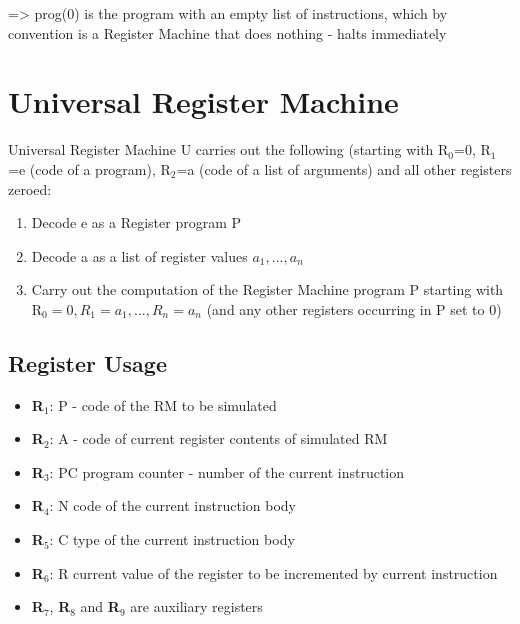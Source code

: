 \documentclass{article}
\begin{document}
=> prog(0) is the program with an empty list of instructions, which by convention is a Register Machine that does nothing - halts immediately

\section{Universal Register Machine}
Universal Register Machine U carries out the following (starting with R$_{0}$=0, R$_{1}$=e (code of a program), R$_{2}$=a (code of a list of arguments) and all other registers zeroed:
\begin{enumerate}
    \item Decode e as a Register program P
    \item Decode a as a list of register values $a_{1}, ..., a_{n}$
    \item Carry out the computation of the Register Machine program P starting with R$_{0}=0, R_{1} = a_{1}, ..., R_{n} = a_{n}$ (and any other registers occurring in P set to 0)
\end{enumerate}

\subsection{Register Usage}
\begin{itemize}
    \item \textbf{R$_{1}$}: P - code of the RM to be simulated
    \item \textbf{R$_{2}$}: A - code of current register contents of simulated RM
    \item \textbf{R$_{3}$}: PC program counter - number of the current instruction
    \item \textbf{R$_{4}$}: N code of the current instruction body
    \item \textbf{R$_{5}$}: C type of the current instruction body
    \item \textbf{R$_{6}$}: R current value of the register to be incremented by current instruction
    
    \item \textbf{R$_{7}$}, \textbf{R$_{8}$} and \textbf{R$_{9}$} are auxiliary registers
\end{itemize}
\end{document}
